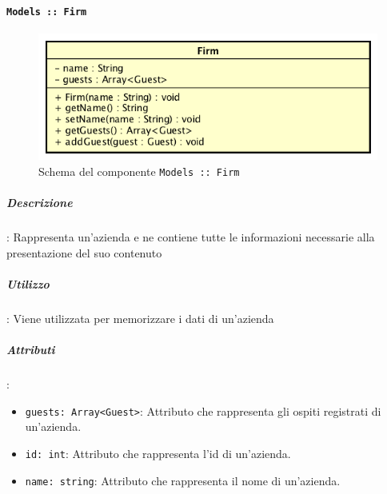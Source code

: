 \documentclass[../DefinizioneDiProdotto_v3.0.0.tex]{subfiles}
\begin{document}
\newpage
	\paragraph{\texttt{Models :: Firm}}
	\acapo
	\begin{figure}[!h]
		\centering
		\includegraphics[scale=0.7]{Architettura/Front-End/Models/Firm.png}
		\caption{Schema del componente \texttt{Models :: Firm}}
	\end{figure}


		\subparagraph{Descrizione}: Rappresenta un'azienda e ne contiene tutte le informazioni necessarie alla presentazione del suo contenuto

		\subparagraph{Utilizzo}: Viene utilizzata per memorizzare i dati di un'azienda

		\subparagraph{Attributi}:
		      \begin{itemize}
		      	\item \texttt{guests: Array<Guest>}:
		      	      Attributo che rappresenta gli ospiti registrati di un'azienda.
		      	\item \texttt{id: int}:
		      	      Attributo che rappresenta l'id di un'azienda.
		      	\item \texttt{name: string}:
		      	      Attributo che rappresenta il nome di un'azienda.
		      \end{itemize}
\end{document}
